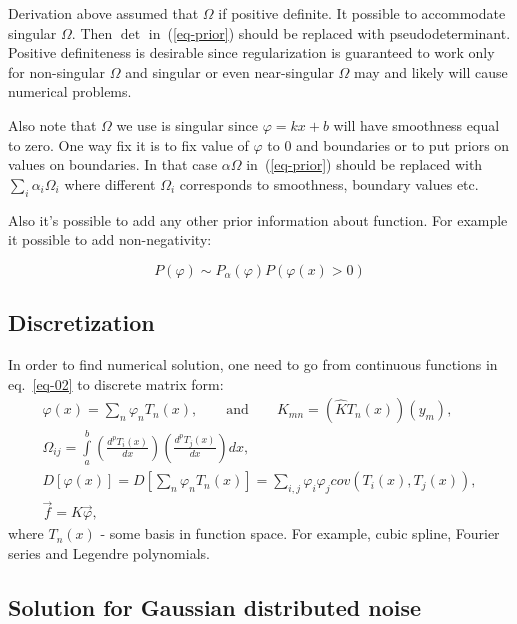 \documentclass{webofc}
\begin{document}
Derivation above assumed that $\Omega$ if positive definite. It possible to
accommodate singular $\Omega$. Then $\det$ in~(\ref{eq-prior}) should be
replaced with pseudodeterminant. Positive definiteness is desirable since
regularization is guaranteed to work only for non-singular $\Omega$ and singular
or even near-singular $\Omega$ may and likely will cause numerical problems.

Also note that $\Omega$ we use is singular since $\varphi = kx + b$ will have
smoothness equal to zero. One way fix it is to fix value of $\varphi$ to 0 and
boundaries or to put priors on values on
boundaries\cite{calvetti2006aristotelian}. In that case $\alpha\Omega$
in~(\ref{eq-prior}) should be replaced with $\sum_i\alpha_i\Omega_i$ where
different $\Omega_i$ corresponds to smoothness, boundary values etc.

Also it's possible to add any other prior information about function. For
example it possible to add non-negativity:

\begin{equation*}
    P(\varphi) \sim P_{\alpha}(\varphi)P(\varphi(x) > 0)
\end{equation*}


\subsection{Discretization}

In order to find numerical solution, one need to go from continuous functions in eq.~\ref{eq-02} to discrete matrix form:
\begin{equation}\label{eq:algebr}
	\begin{gathered}
      \varphi(x) = \sum \limits_n \varphi_n T_n(x),
      \qquad\mbox{and}\qquad
      K_{mn} = (\hat{K}T_n(x))(y_m),\\
      \Omega_{ij} = \int\limits_a^b \left(\frac{d^pT_i(x)}{dx}\right)\left(\frac{d^pT_j(x)}{dx}\right)dx,\\
      D[\varphi(x)] = D[\sum \limits_n \varphi_n T_n(x)] = \sum\limits_{i,j} \varphi_i\varphi_j cov(T_i(x), T_j(x)),\\
      \vec{f} = K\vec{\varphi},
    \end{gathered}
\end{equation}
where $T_n(x)$ - some basis in function space. For example, cubic spline, Fourier series and Legendre polynomials.

\subsection{Solution for Gaussian distributed noise}
\end{document}
